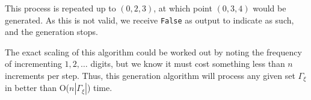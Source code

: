 \documentclass{article}
\newcommand{\braces}[1]{\ensuremath{\left\lbrace #1 \right\rbrace}}
\newcommand{\integers}{\ensuremath{\mathbb{Z}}}
\newcommand{\wholes}{\ensuremath{\mathbb{N}}}
\newcommand{\abs}[1]{\ensuremath{\left|#1\right|}}
\newcommand{\photon}{\ensuremath{\gamma}}
\newcommand{\photons}{\ensuremath{\Gamma}}
\newcommand{\timewindow}{\ensuremath{\xi}}
\begin{document}
This process is repeated up to $(0,2,3)$, at which point $(0,3,4)$ would be generated. As this is not valid, we receive \texttt{False} as output to indicate as such, and the generation stops.

The exact scaling of this algorithm could be worked out by noting the frequency of incrementing $1, 2, \ldots$ digits, but we know it must cost something less than $n$ increments per step. Thus, this generation algorithm will process any given set $\photons_{\timewindow}$ in better than O($n\abs{\photons_{\timewindow}}$) time.

\end{document}
